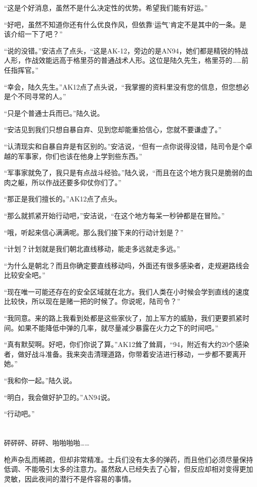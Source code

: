 “这是个好消息，虽然不是什么决定性的优势。希望我们能有好运。”

“好吧，虽然不知道你还有什么优良作风，但依靠‘运气’肯定不是其中的一条。是该介绍一下了吧？”

“说的没错。”安洁点了点头，“这是AK-12，旁边的是AN94，她们都是精锐的特战人形，作战效能远高于格里芬的普通战术人形。这位是陆久先生，格里芬的……前任指挥官。”

“幸会，陆久先生。”AK12点了点头说，“我掌握的资料里没有您的信息，但您想必是个不同寻常的人。”

“只是个普通士兵而已。”陆久说。

“安洁见到我们只想自暴自弃、见到您却能重拾信心，您就不要谦虚了。”

“认清现实和自暴自弃是有区别的。”安洁说，“但有一点你说得没错，陆司令是个卓越的军事家，你们也该在他身上学到些东西。”

“军事家就免了，我只是有点战斗经验。”陆久说，“而且在这个地方我只是脆弱的血肉之躯，所以作战还要多仰仗你们了。”

“那正是我们擅长的。”AK12点了点头。

“那么就抓紧开始行动吧，”安洁说，“在这个地方每呆一秒钟都是在冒险。”

“哦，听起来信心满满呢。那么我们接下来的行动计划是？”

“计划？计划就是我们朝北直线移动，能走多远就走多远。”

“为什么是朝北？而且你确定要直线移动吗，外面还有很多感染者，走规避路线会比较安全吧。”

“现在唯一可能还存在的安全区域就在北方。我们人类在小时候会学到直线的速度比较快，所以现在是赌一把的时候了。你说呢，陆司令？”

“我同意。来的路上我看到处都是这些家伙了，加上军方的威胁，我们更要抓紧时间。如果不能降低中弹的几率，就尽量减少暴露在火力之下的时间吧。”

“真有默契啊。好吧，你们你说了算。”AK12耸了耸肩，“94，附近有大约20个感染者，做好战斗准备。我来突击清理道路，你带着安洁进行移动，一步都不要离开她。”

“我和你一起。”陆久说。

“明白，我会做好护卫的。”AN94说。

“行动吧。”

\section*{}

砰砰砰、砰砰、啪啪啪啪……

枪声杂乱而稀疏，但却非常精准。士兵们没有太多的弹药，而且他们必须尽量保持低调、不能吸引太多的注意力。虽然敌人已经失去了心智，但反应却相对变得更加灵敏，因此夜间的潜行不是件容易的事情。

